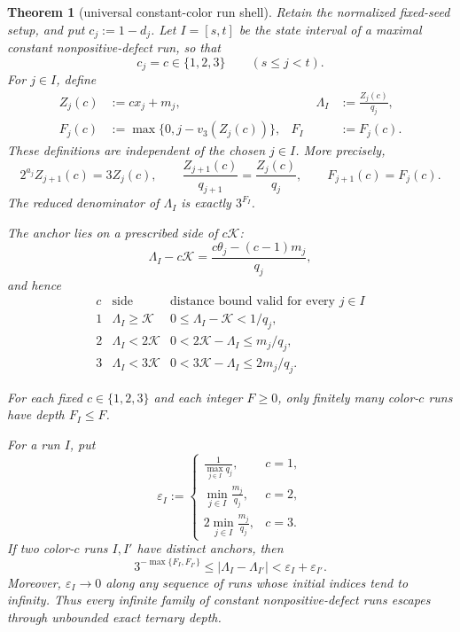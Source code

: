 \documentclass[11pt]{article}
\newtheorem{theorem}{Theorem}
\begin{document}
\begin{theorem}[universal constant-color run shell]
Retain the normalized fixed-seed setup, and put $c_j:=1-d_j$.  Let
$I=[s,t]$ be the state interval of a maximal constant nonpositive-defect
run, so that
\[
  c_j=c\in\{1,2,3\}
  \qquad(s\leq j<t).
  \tag{69}
\]
For $j\in I$, define
\[
\begin{aligned}
  Z_j(c)&:=cx_j+m_j,
  &\qquad
  \Lambda_I&:=\frac{Z_j(c)}{q_j},\\
  F_j(c)&:=\max\{0,j-v_3(Z_j(c))\},
  &
  F_I&:=F_j(c).
\end{aligned}
  \tag{70}
\]
These definitions are independent of the chosen $j\in I$.  More precisely,
\[
\boxed{
  2^{a_j}Z_{j+1}(c)=3Z_j(c),
  \qquad
  \frac{Z_{j+1}(c)}{q_{j+1}}=\frac{Z_j(c)}{q_j},
  \qquad
  F_{j+1}(c)=F_j(c).}
\tag{71}
\]
The reduced denominator of $\Lambda_I$ is exactly $3^{F_I}$.

The anchor lies on a prescribed side of $c\mathcal K$:
\[
\boxed{
  \Lambda_I-c\mathcal K
  =\frac{c\theta_j-(c-1)m_j}{q_j},}
\tag{72}
\]
and hence
\[
\begin{array}{c|c|c}
c&\text{side}&\text{distance bound valid for every }j\in I\\ \hline
1&\Lambda_I\geq\mathcal K&
  0\leq\Lambda_I-\mathcal K<1/q_j,\\
2&\Lambda_I<2\mathcal K&
  0<2\mathcal K-\Lambda_I\leq m_j/q_j,\\
3&\Lambda_I<3\mathcal K&
  0<3\mathcal K-\Lambda_I\leq2m_j/q_j.
\end{array}
\tag{73}
\]

For each fixed $c\in\{1,2,3\}$ and each integer $F\geq0$, only finitely
many color-$c$ runs have depth $F_I\leq F$.

For a run $I$, put
\[
  \varepsilon_I:=
  \begin{cases}
    \displaystyle\frac1{\max_{j\in I}q_j},&c=1,\\[3mm]
    \displaystyle\min_{j\in I}\frac{m_j}{q_j},&c=2,\\[3mm]
    \displaystyle2\min_{j\in I}\frac{m_j}{q_j},&c=3.
  \end{cases}
  \tag{74}
\]
If two color-$c$ runs $I,I'$ have distinct anchors, then
\[
\boxed{
  3^{-\max\{F_I,F_{I'}\}}
  \leq|\Lambda_I-\Lambda_{I'}|
  <\varepsilon_I+\varepsilon_{I'}.}
\tag{75}
\]
Moreover, $\varepsilon_I\to0$ along any sequence of runs whose initial
indices tend to infinity.  Thus every infinite family of constant
nonpositive-defect runs escapes through unbounded exact ternary depth.
\end{theorem}
\end{document}
